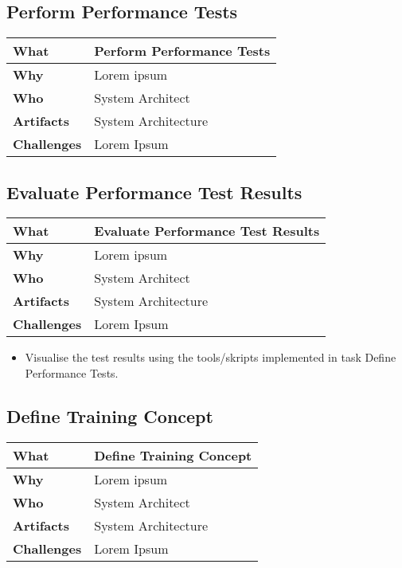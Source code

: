 \subsection{Perform Performance Tests}
\begin{minipage}{\textwidth}
 \label{table:ch6_Task_Perform_Performance_Tests}
\begin{tabular}
	{|m{3cm}|m{10cm}|} \hline \bfseries What & Perform Performance Tests\\
	\hline \bfseries Why & Lorem ipsum\\
	\hline \bfseries Who & System Architect\\
	\hline \bfseries Artifacts & System Architecture\\
	\hline \bfseries Challenges & Lorem Ipsum\\
	\hline 
\end{tabular}
\end{minipage}

\subsection{Evaluate Performance Test Results}
\begin{minipage}{\textwidth}
 \label{table:ch6_Evaluate_Performance_Results}
\begin{tabular}
	{|m{3cm}|m{10cm}|} \hline \bfseries What & Evaluate Performance Test Results\\
	\hline \bfseries Why & Lorem ipsum\\
	\hline \bfseries Who & System Architect\\
	\hline \bfseries Artifacts & System Architecture\\
	\hline \bfseries Challenges & Lorem Ipsum\\
	\hline 
\end{tabular}
\end{minipage}

\begin{itemize}
	\item Visualise the test results using the tools/skripts implemented in task Define Performance Tests.
\end{itemize}

\subsection{Define Training Concept}
\begin{minipage}{\textwidth}
 \label{table:ch6_Task_Define_Training_Concept}
\begin{tabular}
	{|m{3cm}|m{10cm}|} \hline \bfseries What & Define Training Concept\\
	\hline \bfseries Why & Lorem ipsum\\
	\hline \bfseries Who & System Architect\\
	\hline \bfseries Artifacts & System Architecture\\
	\hline \bfseries Challenges & Lorem Ipsum\\
	\hline 
\end{tabular}
\end{minipage}

